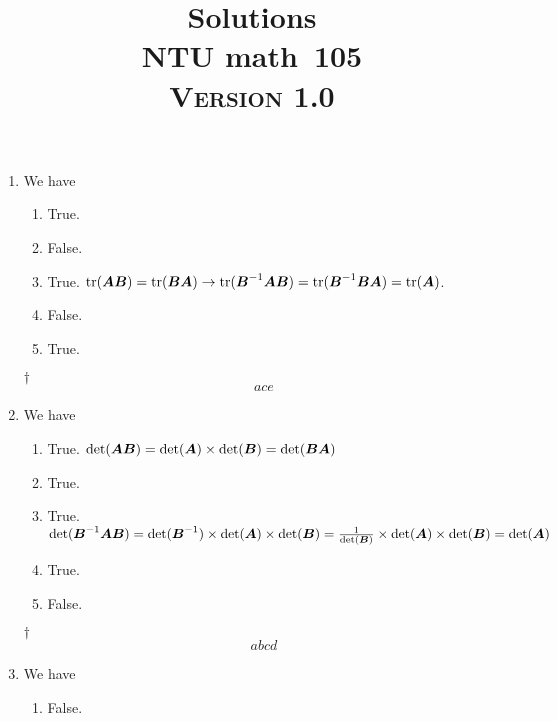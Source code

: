 \documentclass[a4paper,12pt]{article}
\newcommand{\school}{ntu}
\newcommand{\subject}{math}
\renewcommand{\year}{105}
\newcommand{\titlename}{\MakeUppercase{\school} \subject \ \year}
\newcommand{\ver}{\textsc{Version} 1.0} %
\begin{document}
\title{\LARGE{\textbf{Solutions}} \\
	\Huge{\textbf{\titlename}} \\
	\normalsize{\ver}
}
\author{}
\date{}

\maketitle


\begin{enumerate}
	\item We have \begin{enumerate}[label=(\alph*)]
        \item True.
        \item False.
        \item True. $\operatorname{tr}(\boldsymbol{AB}) = \operatorname{tr}(\boldsymbol{BA}) \rightarrow \operatorname{tr}(\boldsymbol{B}^{-1}\boldsymbol{AB}) = \operatorname{tr}(\boldsymbol{B}^{-1}\boldsymbol{BA}) = \operatorname{tr}(\boldsymbol{A})$.
        \item False.
        \item True.
    \end{enumerate}
    \begin{answer}{$\dag$}\begin{equation}
            ace
        \end{equation}
    \end{answer}
    \item We have \begin{enumerate}[label=(\alph*)]
        \item True. $\det(\boldsymbol{AB}) = \det(\boldsymbol{A}) \times \det(\boldsymbol{B}) = \det(\boldsymbol{BA})$
        \item True.
        \item True. $\det(\boldsymbol{B}^{-1}\boldsymbol{AB}) = \det(\boldsymbol{B}^{-1}) \times \det(\boldsymbol{A}) \times \det(\boldsymbol{B}) = \frac{1}{\det(\boldsymbol{B})} \times \det(\boldsymbol{A}) \times \det(\boldsymbol{B}) = \det(\boldsymbol{A})$
        \item True.
        \item False.
    \end{enumerate}
    \begin{answer}{$\dag$}\begin{equation}
            abcd       
        \end{equation}
    \end{answer}
    \item We have \begin{enumerate}[label=(\alph*)]
        \item False.

\end{enumerate}
\end{enumerate}
\end{document}
